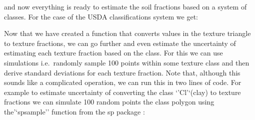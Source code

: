 \documentclass[graybox,natbib,nospthms,UStrade]{svmono}
\newenvironment{Shaded}{\begin{snugshade}}{\end{snugshade}}
\newcommand{\CommentTok}[1]{\textcolor[rgb]{0.37,0.37,0.37}{\textit{#1}}}
\newcommand{\DecValTok}[1]{\textcolor[rgb]{0.06,0.06,0.06}{#1}}
\newcommand{\KeywordTok}[1]{\textcolor[rgb]{0.27,0.27,0.27}{\textbf{#1}}}
\newcommand{\NormalTok}[1]{#1}
\newcommand{\OperatorTok}[1]{\textcolor[rgb]{0.43,0.43,0.43}{\textbf{#1}}}
\newcommand{\StringTok}[1]{\textcolor[rgb]{0.5,0.5,0.5}{#1}}
\begin{document}
and now everything is ready to estimate the soil fractions based on a system of classes. For the case of the USDA classifications system we get:

\begin{Shaded}
\end{Shaded}

Now that we have created a function that converts values in the texture triangle to texture fractions, we can go further and even estimate the uncertainty of estimating each texture fraction based on the class. For this we can use simulations i.e.~randomly sample 100 points within some texture class and then derive standard deviations for each texture fraction. Note that, although this sounds like a complicated operation, we can run this in two lines of code. For example to estimate uncertainty of converting the class `'Cl'`(clay) to texture fractions we can simulate 100 random points the class polygon using the'`spsample'' function from the sp package \citep{Bivand2013Springer}:
\end{document}
